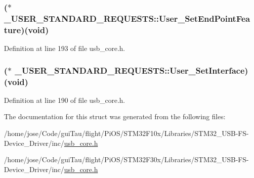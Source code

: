 \hypertarget{struct___u_s_e_r___s_t_a_n_d_a_r_d___r_e_q_u_e_s_t_s_af474cb0e995bee01160de85bba8ce15f}{
\subsubsection[{User\-\_\-\-Set\-End\-Point\-Feature}]{($\ast$ \-\_\-\-U\-S\-E\-R\-\_\-\-S\-T\-A\-N\-D\-A\-R\-D\-\_\-\-R\-E\-Q\-U\-E\-S\-T\-S\-::\-User\-\_\-\-Set\-End\-Point\-Feature)({\bf void})}}\label{struct___u_s_e_r___s_t_a_n_d_a_r_d___r_e_q_u_e_s_t_s_af474cb0e995bee01160de85bba8ce15f}


Definition at line 193 of file usb\-\_\-core.\-h.

\hypertarget{struct___u_s_e_r___s_t_a_n_d_a_r_d___r_e_q_u_e_s_t_s_a101eeb87dcd0e23f7df47c3c034eb7bf}{
\subsubsection[{User\-\_\-\-Set\-Interface}]{($\ast$ \-\_\-\-U\-S\-E\-R\-\_\-\-S\-T\-A\-N\-D\-A\-R\-D\-\_\-\-R\-E\-Q\-U\-E\-S\-T\-S\-::\-User\-\_\-\-Set\-Interface)({\bf void})}}\label{struct___u_s_e_r___s_t_a_n_d_a_r_d___r_e_q_u_e_s_t_s_a101eeb87dcd0e23f7df47c3c034eb7bf}


Definition at line 190 of file usb\-\_\-core.\-h.



The documentation for this struct was generated from the following files\-:\begin{DoxyCompactItemize}
\item 
/home/jose/\-Code/gui\-Tau/flight/\-Pi\-O\-S/\-S\-T\-M32\-F10x/\-Libraries/\-S\-T\-M32\-\_\-\-U\-S\-B-\/\-F\-S-\/\-Device\-\_\-\-Driver/inc/\hyperlink{_s_t_m32_f10x_2_libraries_2_s_t_m32___u_s_b-_f_s-_device___driver_2inc_2usb__core_8h}{usb\-\_\-core.\-h}\item 
/home/jose/\-Code/gui\-Tau/flight/\-Pi\-O\-S/\-S\-T\-M32\-F30x/\-Libraries/\-S\-T\-M32\-\_\-\-U\-S\-B-\/\-F\-S-\/\-Device\-\_\-\-Driver/inc/\hyperlink{_s_t_m32_f30x_2_libraries_2_s_t_m32___u_s_b-_f_s-_device___driver_2inc_2usb__core_8h}{usb\-\_\-core.\-h}\end{DoxyCompactItemize}
